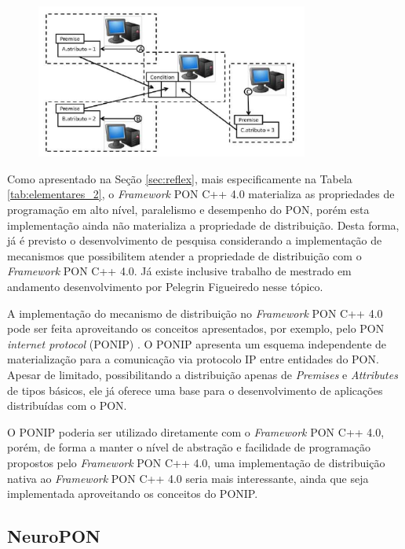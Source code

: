 \begin{figure}[!htb]
\centering
\caption{Comunicação distribuída com o PON}
\includegraphics[width=0.8\textwidth]{../figures/pon_dist.PNG}
\smallskip
\caption{}
\label{fig:pon_dist}
\end{figure}

Como apresentado na Seção \ref{sec:reflex}, mais especificamente na Tabela
\ref{tab:elementares_2}, o \textit{Framework} PON C++ 4.0 materializa as
propriedades de programação em alto nível, paralelismo e desempenho do PON,
porém esta implementação ainda não materializa a propriedade de distribuição.
Desta forma, já é previsto o desenvolvimento de pesquisa considerando a
implementação de mecanismos que possibilitem atender a propriedade de
distribuição com o \textit{Framework} PON C++ 4.0. Já existe inclusive trabalho
de mestrado em andamento desenvolvimento por Pelegrin Figueiredo nesse
tópico.

A implementação do mecanismo de distribuição no \textit{Framework} PON C++ 4.0
pode ser feita aproveitando os conceitos apresentados, por exemplo, pelo PON
\textit{internet protocol} (PONIP) \cite{talau_2016}. O PONIP apresenta um
esquema independente de materialização para a comunicação via protocolo IP entre
entidades do PON. Apesar de limitado, possibilitando a distribuição apenas de
\textit{Premises} e \textit{Attributes} de tipos básicos, ele já oferece uma
base para o desenvolvimento de aplicações distribuídas com o PON.

O PONIP poderia ser utilizado diretamente com o \textit{Framework} PON C++ 4.0,
porém, de forma a manter o nível de abstração e facilidade de programação
propostos pelo \textit{Framework} PON C++ 4.0, uma implementação de distribuição
nativa ao \textit{Framework} PON C++ 4.0 seria mais interessante, ainda que seja
implementada aproveitando os conceitos do PONIP.

\subsection{NeuroPON}\label{sec:neuropon_futuro}

